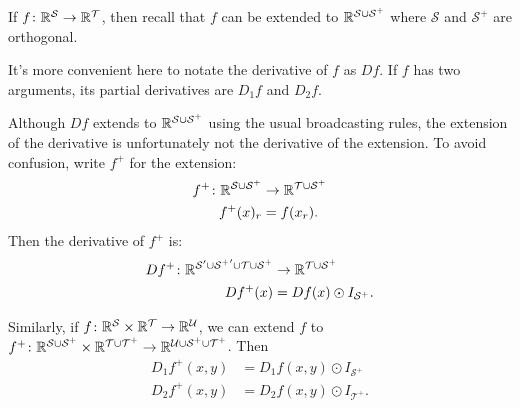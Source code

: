 If $f \colon \mathbb{R}^\mathcal{S} \rightarrow \mathbb{R}^\mathcal{T}$, then recall that $f$ can be extended to $\mathbb{R}^{\mathcal{S} \cup \mathcal{S^+}}$ where $\mathcal{S}$ and $\mathcal{S^+}$ are orthogonal.

It's more convenient here to notate the derivative of $f$ as $Df$. If $f$ has two arguments, its partial derivatives are $D_1 f$ and $D_2 f$.

Although $Df$ extends to $\mathbb{R}^{\mathcal{S} \cup \mathcal{S^+}}$ using the usual broadcasting rules, the extension of the derivative is unfortunately not the derivative of the extension. To avoid confusion, write $f^+$ for the extension:
\begin{align*}
  f^+ \colon \mathbb{R}^{\mathcal{S} \cup \mathcal{S^+}} &\rightarrow \mathbb{R}^{\mathcal{T} \cup \mathcal{S^+}} \\
  f^+(x)_r &= f(x_r).
\end{align*}
Then the derivative of $f^+$ is:
\begin{align*}
  Df^+ \colon \mathbb{R}^{\mathcal{S'} \cup \mathcal{{S^+}'} \cup \mathcal{T} \cup \mathcal{S^+}} &\rightarrow \mathbb{R}^{\mathcal{T} \cup \mathcal{S^+}} \\
  Df^+(x) &= Df(x) \odot I_{\mathcal{S}^+}.
\end{align*}  

Similarly, if $f \colon \mathbb{R}^\mathcal{S} \times \mathbb{R}^\mathcal{T} \rightarrow \mathbb{R}^\mathcal{U}$, we can extend $f$ to $f^+ \colon \mathbb{R}^\mathcal{S \cup S^+} \times \mathbb{R}^\mathcal{T \cup T^+} \rightarrow \mathbb{R}^\mathcal{U \cup S^+ \cup T^+}$. Then
\begin{align*}
  D_1 f^+(x, y) &= D_1 f(x, y) \odot I_{\mathcal{S}^+} \\
  D_2 f^+(x, y) &= D_2 f(x, y) \odot I_{\mathcal{T}^+}.
\end{align*}

